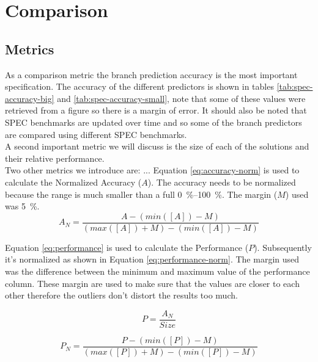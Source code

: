 
\section{Comparison}
\subsection{Metrics}
As a comparison metric the branch prediction accuracy is the most important specification. The accuracy of the different predictors is shown in tables \ref{tab:spec-accuracy-big} and \ref{tab:spec-accuracy-small}, note that some of these values were retrieved from a figure so there is a margin of error.
It should also be noted that SPEC benchmarks are updated over time and so some of the branch predictors are compared using different SPEC benchmarks.\\
A second important metric we will discuss is the size of each of the solutions and their relative performance.\\

Two other metrics we introduce are: ... 
Equation \ref{eq:accuracy-norm} is used to calculate the Normalized Accuracy ($A$).
The accuracy needs to be normalized because the range is much smaller than a full \SIrange{0}{100}{\percent}.
The margin ($M$) used was \SI{5}{\percent}.
\begin{equation}
\label{eq:accuracy-norm}
A_{N} = \frac{A - (min([A]) - M)}{(max([A]) + M)-(min([A]) - M)}
\end{equation}

Equation \ref{eq:performance} is used to calculate the Performance ($P$).
Subsequently it's normalized as shown in Equation \ref{eq:performance-norm}.
The margin used was the difference between the minimum and maximum value of the performance column. These margin are used to make sure that the values are closer to each other therefore the outliers don't distort the results too much.

\begin{equation}
\label{eq:performance}
P = \frac{A_{N}}{Size}
\end{equation}

\begin{equation}
\label{eq:performance-norm}
P_{N} = \frac{P - (min([P]) - M)}{(max([P]) + M)-(min([P]) - M)}
\end{equation}


